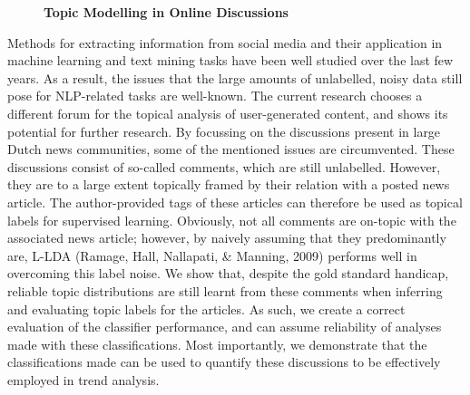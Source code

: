 \documentclass[10pt, a4paper, twopage, headinclude, footinclude, BCOR5mm]{book}
\begin{document}
\newpage

\begin{figure}[t!]
\centering
\large\textbf{Topic Modelling in Online Discussions}
\vspace*{0.5cm}
\end{figure}


\begin{table}[t!]
\end{table} 
\noindent
Methods for extracting information from social media and their application in machine learning and text mining tasks have been well studied over the last few years. As a result, the issues that the large amounts of unlabelled, noisy data still pose for NLP-related tasks are well-known. The current research chooses a different forum for the topical analysis of user-generated content, and shows its potential for further research.  By focussing on the discussions present in large Dutch news communities, some of the mentioned issues are circumvented. These discussions consist of so-called comments, which are still unlabelled. However, they are to a large extent topically framed by their relation with a posted news article. The author-provided tags of these articles can therefore be used as topical labels for supervised learning.  Obviously, not all comments are on-topic with the associated news article; however, by naively assuming that they predominantly are, L-LDA (Ramage, Hall, Nallapati, \& Manning, 2009) performs well in overcoming this label noise. We show that, despite the gold standard handicap, reliable topic distributions are still learnt from these comments when inferring and evaluating topic labels for the articles. As such, we create a correct evaluation of the classifier performance, and can assume reliability of analyses made with these classifications. Most importantly, we demonstrate that the classifications made can be used to quantify these discussions to be effectively employed in trend analysis.     
\end{document}
